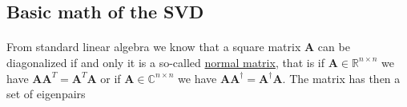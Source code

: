 \documentclass[%
oneside,                 %
final,                   %
10pt]{article}
\begin{document}
\subsection*{Basic math of the SVD}

\paragraph{}

From standard linear algebra we know that a square matrix $\bm{A}$ can be diagonalized if and only it is 
a so-called \href{{https://en.wikipedia.org/wiki/Normal_matrix}}{normal matrix}, that is if $\bm{A}\in {\mathbb{R}}^{n\times n}$
we have $\bm{A}\bm{A}^T=\bm{A}^T\bm{A}$ or if $\bm{A}\in {\mathbb{C}}^{n\times n}$ we have $\bm{A}\bm{A}^{\dagger}=\bm{A}^{\dagger}\bm{A}$.
The matrix has then a set of eigenpairs 
\end{document}
